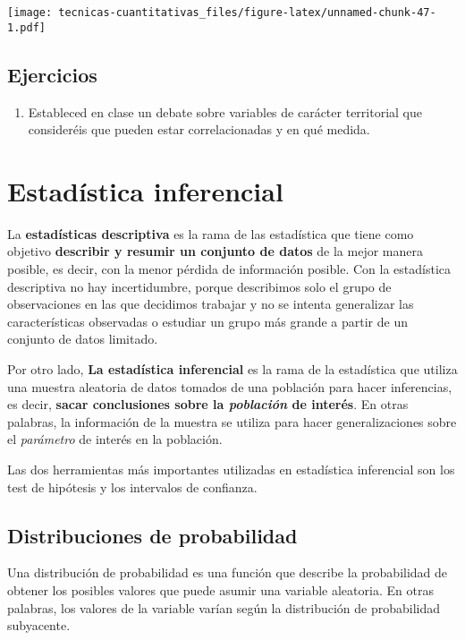 \documentclass[
]{book}
\providecommand{\tightlist}{%
  \setlength{\itemsep}{0pt}\setlength{\parskip}{0pt}}
\begin{document}
\texttt{[image: tecnicas-cuantitativas\_files/figure-latex/unnamed-chunk-47-1.pdf]}

\hypertarget{ejercicios}{%
\section{Ejercicios}\label{ejercicios}}

\begin{enumerate}
\def\labelenumi{\arabic{enumi}.}
\tightlist
\item
  Estableced en clase un debate sobre variables de carácter territorial que consideréis que pueden estar correlacionadas y en qué medida.
\end{enumerate}

\hypertarget{estaduxedstica-inferencial}{%
\chapter{Estadística inferencial}\label{estaduxedstica-inferencial}}

La \textbf{estadísticas descriptiva} es la rama de las estadística que tiene como objetivo \textbf{describir y resumir un conjunto de datos} de la mejor manera posible, es decir, con la menor pérdida de información posible. Con la estadística descriptiva no hay incertidumbre, porque describimos solo el grupo de observaciones en las que decidimos trabajar y no se intenta generalizar las características observadas o estudiar un grupo más grande a partir de un conjunto de datos limitado.

Por otro lado, \textbf{La estadística inferencial} es la rama de la estadística que utiliza una muestra aleatoria de datos tomados de una población para hacer inferencias, es decir, \textbf{sacar conclusiones sobre la \emph{población} de interés}. En otras palabras, la información de la muestra se utiliza para hacer generalizaciones sobre el \emph{parámetro} de interés en la población.

Las dos herramientas más importantes utilizadas en estadística inferencial son los test de hipótesis y los intervalos de confianza.

\hypertarget{distribuciones-de-probabilidad}{%
\section{Distribuciones de probabilidad}\label{distribuciones-de-probabilidad}}

Una distribución de probabilidad es una función que describe la probabilidad de obtener los posibles valores que puede asumir una variable aleatoria. En otras palabras, los valores de la variable varían según la distribución de probabilidad subyacente.
\end{document}
